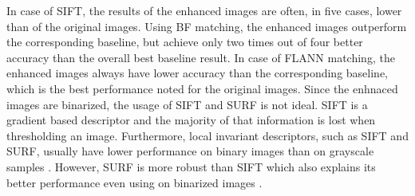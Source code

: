 \documentclass[draft,final]{vutinfth} %
\begin{document}
In case of SIFT, the results of the enhanced images are often, in five cases, lower than of the original images.
Using BF matching, the enhanced images outperform the corresponding baseline, but achieve only two times out of four better accuracy than the overall best baseline result.
In case of FLANN matching, the enhanced images always have lower accuracy than the corresponding baseline, which is the best performance noted for the original images. 
Since the enhnaced images are binarized, the usage of SIFT and SURF is not ideal.
SIFT is a gradient based descriptor and the majority of that information is lost when thresholding an image.
Furthermore, local invariant descriptors, such as SIFT and SURF, usually have lower performance on binary images than on grayscale samples \cite{wang2017manifold}.
However, SURF is more robust than SIFT which also explains its better performance even using on binarized images \cite{bay2006surf}.

\end{document}
